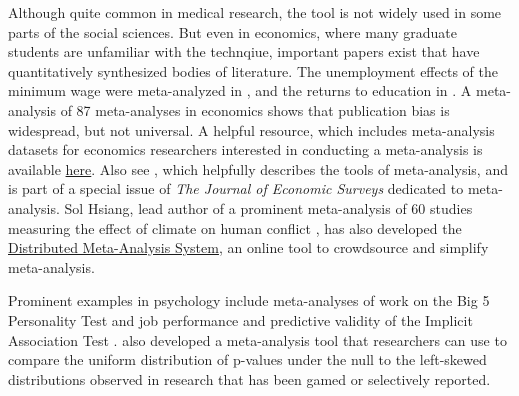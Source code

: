 \documentclass[12pt] {article}
\begin{document}
Although quite common in medical research, the tool is not widely used in some parts of the social sciences. But even in economics, where many graduate students are unfamiliar with the technqiue, important papers exist that have quantitatively synthesized bodies of literature. The unemployment effects of the minimum wage were meta-analyzed in \cite{card1995time}, and the returns to education in \cite{ashenfelter1999review}. A meta-analysis of 87 meta-analyses in economics shows that publication bias is widespread, but not universal. A helpful resource, which includes meta-analysis datasets for economics researchers interested in conducting a meta-analysis is available \href{http://www.deakin.edu.au/business/economics/research/meta-analysis}{here}. Also see \cite{stanley2005beyond}, which helpfully describes the tools of meta-analysis, and is part of a special issue of \textit{The Journal of Economic Surveys} dedicated to meta-analysis. Sol Hsiang, lead author of a prominent meta-analysis of 60 studies measuring the effect of climate on human conflict \citep{hsiang2013climate}, has also developed the \href{http://dmas.berkeley.edu}{Distributed Meta-Analysis System}, an online tool to crowdsource and simplify meta-analysis.

Prominent examples in psychology include meta-analyses of work on the Big 5 Personality Test and job performance \citep{barrick1991big5} and predictive validity of the Implicit Association Test \citep{greenwald2009understanding}. \cite{simonsohn2014p} also developed a meta-analysis tool that researchers can use to compare the uniform distribution of p-values under the null to the left-skewed distributions observed in research that has been gamed or selectively reported.

\end{document}
